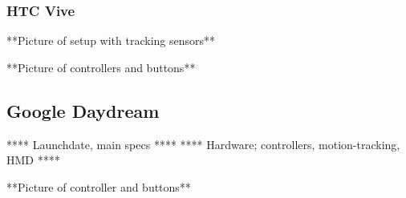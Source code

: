 \subsubsection{HTC Vive}
**Picture of setup with tracking sensors**

\label{result:hardware:vive}
**Picture of controllers and buttons**

\subsection{Google Daydream}
**** Launchdate, main specs ****
**** Hardware; controllers, motion-tracking, HMD ****

\label{result:hardware:daydream}
**Picture of controller and buttons**
